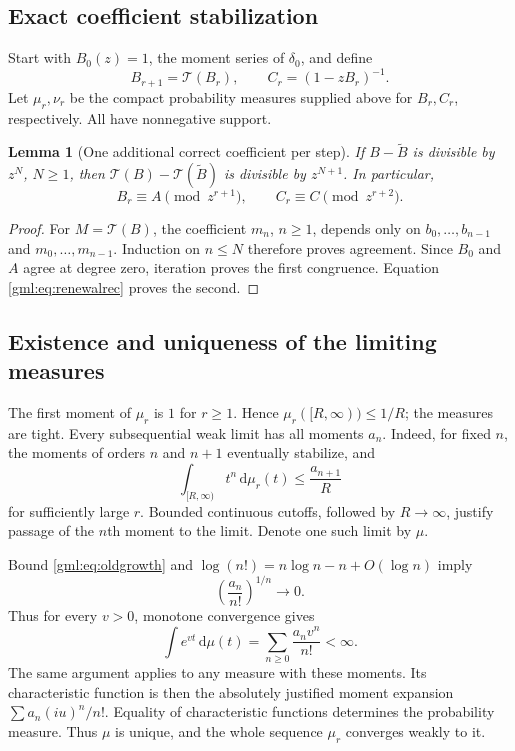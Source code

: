 \documentclass[11pt]{article}
\numberwithin{equation}{section}
\newtheorem{lemma}[theorem]{Lemma}
\theoremstyle{definition}
\theoremstyle{remark}
\newcommand{\dd}{\,\mathrm d}
\newcommand{\T}{\mathcal T}
\begin{document}
\subsection{Exact coefficient stabilization}
Start with $B_0(z)=1$, the moment series of $\delta_0$, and define
\begin{equation}\label{gml:eq:iterations}
 B_{r+1}=\T(B_r),\qquad C_r=(1-zB_r)^{-1}.
\end{equation}
Let $\mu_r,\nu_r$ be the compact probability measures supplied above for
$B_r,C_r$, respectively. All have nonnegative support.

\begin{lemma}[One additional correct coefficient per step]\label{gml:lem:stable}
If $B-\widetilde B$ is divisible by $z^N$, $N\ge1$, then
$\T(B)-\T(\widetilde B)$ is divisible by $z^{N+1}$. In particular,
\begin{equation}\label{gml:eq:stable}
 B_r\equiv A\pmod{z^{r+1}},\qquad C_r\equiv C\pmod{z^{r+2}}.
\end{equation}
\end{lemma}
\begin{proof}
For $M=\T(B)$, the coefficient $m_n$, $n\ge1$, depends only on
$b_0,\ldots,b_{n-1}$ and $m_0,\ldots,m_{n-1}$. Induction on $n\le N$
therefore proves agreement. Since $B_0$ and $A$ agree at degree zero,
iteration proves the first congruence. Equation \eqref{gml:eq:renewalrec}
proves the second.
\end{proof}

\subsection{Existence and uniqueness of the limiting measures}
The first moment of $\mu_r$ is $1$ for $r\ge1$. Hence
$\mu_r([R,\infty))\le1/R$; the measures are tight. Every subsequential
weak limit has all moments $a_n$. Indeed, for fixed $n$, the moments of
orders $n$ and $n+1$ eventually stabilize, and
\[
 \int_{[R,\infty)}t^n\dd\mu_r(t)\le\frac{a_{n+1}}R
\]
for sufficiently large $r$. Bounded continuous cutoffs, followed by
$R\to\infty$, justify passage of the $n$th moment to the limit.
Denote one such limit by $\mu$.

Bound \eqref{gml:eq:oldgrowth} and
$\log(n!)=n\log n-n+O(\log n)$ imply
\begin{equation}\label{gml:eq:entire}
 \left(\frac{a_n}{n!}\right)^{1/n}\longrightarrow0.
\end{equation}
Thus for every $v>0$, monotone convergence gives
\[
 \int e^{vt}\dd\mu(t)=\sum_{n\ge0}\frac{a_nv^n}{n!}<\infty.
\]
The same argument applies to any measure with these moments. Its
characteristic function is then the absolutely justified moment expansion
$\sum a_n(iu)^n/n!$. Equality of characteristic functions determines the
probability measure. Thus $\mu$ is unique, and the whole sequence
$\mu_r$ converges weakly to it.
\end{document}
